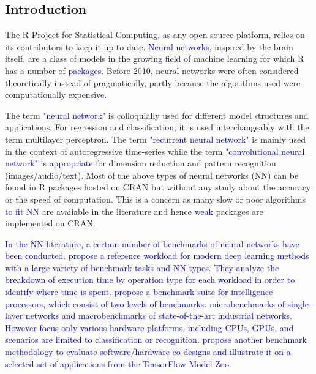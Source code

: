 \hypertarget{introduction}{%
\subsection{Introduction}\label{introduction}}

The \textsf{R} Project for Statistical Computing, as any open-source
platform, relies on its contributors to keep it up to date.
\textcolor{blue}{Neural networks}, inspired by the brain itself, are a
class of models in the growing field of machine learning for which
\textsf{R} has a number of \textcolor{blue}{packages}. Before 2010,
neural networks were often considered theoretically instead of
pragmatically, partly because the algorithms used were computationally
expensive.

The term \textcolor{blue}{"neural network"} is colloquially used for
different model structures and applications. For regression and
classification, it is used interchangeably with the term multilayer
perceptron. The term \textcolor{blue}{"recurrent neural network"} is
mainly used in the context of autoregressive time-series while the term
\textcolor{blue}{"convolutional neural network"} is
\textcolor{blue}{appropriate} for dimension reduction and pattern
recognition (images/audio/text). Most of the above types of neural
networks (NN) can be found in \textsf{R} packages hosted on CRAN but
without any study about the accuracy or the speed of computation. This
is a concern as many slow or poor algorithms \textcolor{blue}{to fit NN}
are available in the literature and hence \textcolor{blue}{weak}
packages are implemented on CRAN.

\textcolor{blue}{In the NN literature, a certain number
of benchmarks of neural networks have been conducted.
\citep{adolf2016fathom} propose a reference workload
for modern deep learning methods with a large variety
of benchmark tasks and NN types. 
They analyze the breakdown of execution time by operation 
type for each workload in order to identify where time
is spent.
\citep{tao2018benchip} propose a benchmark suite for 
intelligence processors, which consist of two levels 
of benchmarks: microbenchmarks of single-layer networks 
and macrobenchmarks of state-of-the-art industrial networks.
However \citep{tao2018benchip} focus only various hardware
platforms, including CPUs, GPUs, and scenarios are limited
to classification or recognition.
\citep{xie2020nnbench} propose another benchmark methodology
to evaluate software/hardware co-designs and illustrate
it on a selected set of applications from the TensorFlow Model Zoo. 
}

